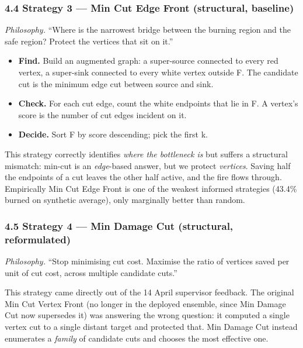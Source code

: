 \documentclass[
  11pt,
]{article}
\providecommand{\tightlist}{%
  \setlength{\itemsep}{0pt}\setlength{\parskip}{0pt}}
\begin{document}
\subsubsection{4.4 Strategy 3 --- Min Cut Edge Front (structural,
baseline)}\label{strategy-3-min-cut-edge-front-structural-baseline}

\emph{Philosophy.} ``Where is the narrowest bridge between the burning
region and the safe region? Protect the vertices that sit on it.''

\begin{itemize}
\tightlist
\item
  \textbf{Find.} Build an augmented graph: a super-source connected to
  every red vertex, a super-sink connected to every white vertex outside
  F. The candidate cut is the minimum edge cut between source and sink.
\item
  \textbf{Check.} For each cut edge, count the white endpoints that lie
  in F. A vertex's score is the number of cut edges incident on it.
\item
  \textbf{Decide.} Sort F by score descending; pick the first k.
\end{itemize}

This strategy correctly identifies \emph{where the bottleneck is} but
suffers a structural mismatch: min-cut is an \emph{edge}-based answer,
but we protect \emph{vertices}. Saving half the endpoints of a cut
leaves the other half active, and the fire flows through. Empirically
Min Cut Edge Front is one of the weakest informed strategies (43.4\%
burned on synthetic average), only marginally better than random.

\subsubsection{4.5 Strategy 4 --- Min Damage Cut (structural,
reformulated)}\label{strategy-4-min-damage-cut-structural-reformulated}

\emph{Philosophy.} ``Stop minimising cut cost. Maximise the ratio of
vertices saved per unit of cut cost, across multiple candidate cuts.''

This strategy came directly out of the 14 April supervisor feedback. The
original Min Cut Vertex Front (no longer in the deployed ensemble, since
Min Damage Cut now supersedes it) was answering the wrong question: it
computed a single vertex cut to a single distant target and protected
that. Min Damage Cut instead enumerates a \emph{family} of candidate
cuts and chooses the most effective one.
\end{document}
